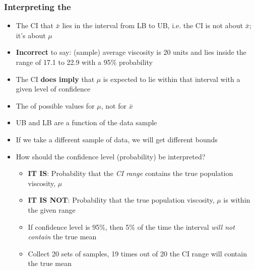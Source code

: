 \begin{frame}\frametitle{Interpreting the {\color{purple}{confidence interval (CI)}}}
	\begin{itemize}
		\item	The CI {} that $\bar{x}$ lies in the interval from LB to UB, i.e. the CI is not about $\bar{x}$; it's about $\mu$
		\item	\textbf{Incorrect} to say: (sample) average viscosity is 20 units and lies inside the range of 17.1 to 22.9 with a 95\% probability
		\item	The CI \textbf{does imply} that $\mu$ is expected to lie within that interval with a given level of confidence
		\item	The {} of possible values for $\mu$, not for $\bar{x}$ 
		\item	UB and LB are a function of the data sample
		\item	If we take a different sample of data, we will get different bounds
		\item	How should the confidence level (probability) be interpreted?
		\begin{itemize}
			\item	\textbf{IT IS}: Probability that the \emph{CI range} contains the true population viscosity, $\mu$
			\item	\textbf{IT IS NOT}: Probability that the true population viscosity, $\mu$ is within the given range {}
			\item	If confidence level is 95\%, then 5\% of the time the interval \emph{will not contain} the true mean
			\item	Collect 20 sets of samples, 19 times out of 20 the CI range will contain the true mean
		\end{itemize}
	\end{itemize}
\end{frame}

